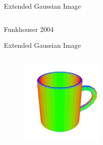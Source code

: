 \documentclass{beamer}
\begin{document}
\begin{frame}{Extended Gaussian Image}
\begin{columns}[c]
\end{columns}


\begin{itemize}[label=$\vartriangleright$]


\end{itemize}

\small Funkhouser 2004

\end{frame}



\begin{frame}{Extended Gaussian Image}

\begin{columns}[c]

\begin{figure}[t]
    \includegraphics[width=0.5\textwidth]{origCoffeeMug.png}
\end{figure}


\end{columns}
\end{frame}
\end{document}
